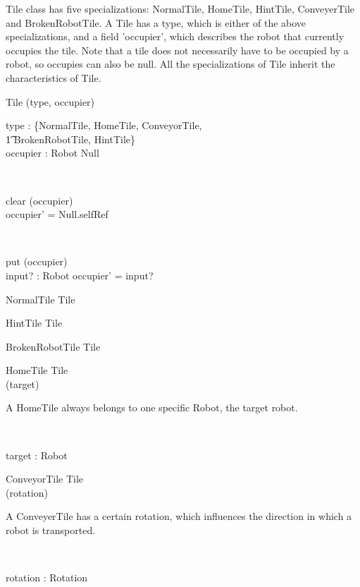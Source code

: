 \documentclass[12pt]{article}
\begin{document}
Tile class has five specializations: NormalTile, HomeTile, HintTile, ConveyerTile and BrokenRobotTile. A Tile has a type, which is either of the above specializations, and a field 'occupier', which describes the robot that currently occupies the tile. Note that a tile does not necessarily have to be occupied by a robot, so occupies can also be null. All the specializations of Tile inherit the characteristics of Tile.
\begin{class}{Tile}
\upharpoonright (type, occupier) \\
\begin{state}
type : \{NormalTile, HomeTile, ConveyorTile, \\ \t1 BrokenRobotTile, HintTile\} \\
occupier : Robot \cup Null
\end{state} \\
\begin{schema}{clear}
\Delta (occupier) \\
\where
occupier' = Null.selfRef
\end{schema} \\
\begin{schema}{put}
\Delta (occupier) \\
input? : Robot
\where
occupier' = input?
\end{schema}
\end{class}

\begin{class}{NormalTile}
Tile
\end{class}

\begin{class}{HintTile}
Tile
\end{class}

\begin{class}{BrokenRobotTile}
Tile
\end{class}

\begin{class}{HomeTile}
Tile \\
\upharpoonright (target) \\
\begin{classcom}
A HomeTile always belongs to one specific Robot, the target robot.
\end{classcom} \\
\begin{state}
target : Robot
\end{state}
\end{class}

\begin{class}{ConveyorTile}
Tile \\
\upharpoonright (rotation) \\
\begin{classcom}
A ConveyerTile has a certain rotation, which influences the direction in which a robot is transported.
\end{classcom} \\
\begin{state}
rotation : Rotation
\end{state}
\end{class}
\end{document}
